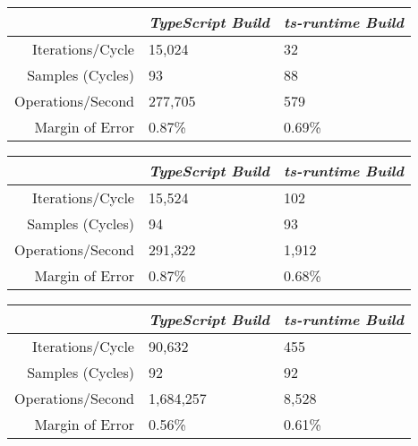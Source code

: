 \begin{minipage}{\textwidth}
\begin{center}
{
\centering
\tabulinesep=1.2mm
\setlength{\tabcolsep}{5mm}
\def\arraystretch{1.25}
\small
\begin{tabu} to \textwidth {|r||X[c,m]|X[c,m]|}
  \hline
  & \emph{TypeScript Build} & \emph{ts-runtime Build} \\
  \hline
  \hline
  Iterations/Cycle  & 15,024 & 32 \\
  \hline
  Samples (Cycles)  & 93 & 88 \\
  \hline
  Operations/Second & 277,705 & 579 \\
  \hline
  Margin of Error   & 0.87\% & 0.69\% \\
  \hline
\end{tabu}
}
\end{center}

\begin{center}
{
\centering
\tabulinesep=1.2mm
\setlength{\tabcolsep}{5mm}
\def\arraystretch{1.25}
\small
\begin{tabu} to \textwidth {|r||X[c,m]|X[c,m]|}
  \hline
  & \emph{TypeScript Build} & \emph{ts-runtime Build} \\
  \hline
  \hline
  Iterations/Cycle  & 15,524 & 102 \\
  \hline
  Samples (Cycles)  & 94 & 93 \\
  \hline
  Operations/Second & 291,322 & 1,912 \\
  \hline
  Margin of Error   & 0.87\% & 0.68\% \\
  \hline
\end{tabu}
}
\end{center}
\end{minipage}

\begin{center}
{
\centering
\tabulinesep=1.2mm
\setlength{\tabcolsep}{5mm}
\def\arraystretch{1.25}
\small
\begin{tabu} to \textwidth {|r||X[c,m]|X[c,m]|}
  \hline
  & \emph{TypeScript Build} & \emph{ts-runtime Build} \\
  \hline
  \hline
  Iterations/Cycle  & 90,632 & 455 \\
  \hline
  Samples (Cycles)  & 92 & 92 \\
  \hline
  Operations/Second & 1,684,257 & 8,528 \\
  \hline
  Margin of Error   & 0.56\% & 0.61\% \\
  \hline
\end{tabu}
}
\end{center}

